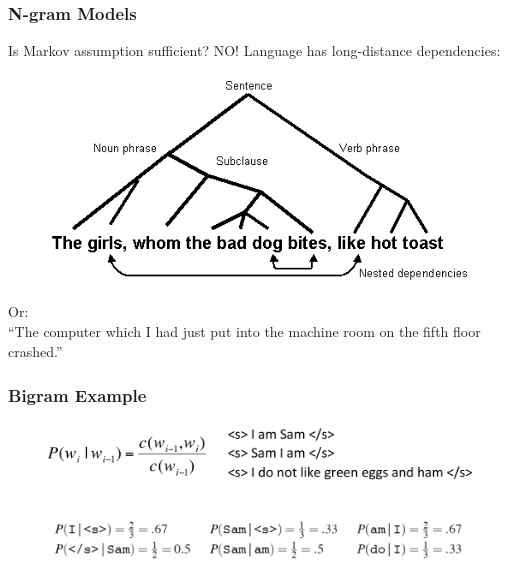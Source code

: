 \documentclass{beamer}
\begin{document}

\begin{frame}\frametitle{N-gram Models}

\begin{block}{Is Markov assumption sufficient? \alert{NO!}}
Language has long-distance dependencies:

\begin{figure}
\includegraphics[width=0.6\linewidth]{figure/long-distance-dependency.png}
\label{fig:long-distance-dependency}
\end{figure}

Or:  \\

``The computer which I had just put into the machine room on the fifth
floor crashed.'' 

\end{block}
\end{frame}


\begin{frame}\frametitle{Bigram Example}
\begin{figure}
\includegraphics[width=1\linewidth]{figure/bigram_example.pdf}
\label{fig:bigram_example}
\end{figure}

\end{frame}
\end{document}
